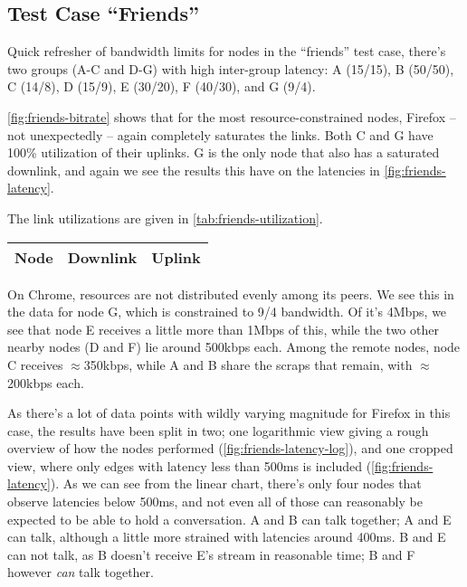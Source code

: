 \subsection{Test Case ``Friends''}

Quick refresher of bandwidth limits for nodes in the ``friends'' test case, there's two groups (A-C and D-G) with high inter-group latency: A (15/15), B (50/50), C (14/8), D (15/9), E (30/20), F (40/30), and G (9/4).

\autoref{fig:friends-bitrate} shows that for the most resource-constrained nodes, Firefox -- not unexpectedly -- again completely saturates the links. Both C and G have 100\% utilization of their uplinks. G is the only node that also has a saturated downlink, and again we see the results this have on the latencies in \autoref{fig:friends-latency}.

The link utilizations are given in \autoref{tab:friends-utilization}.

\begin{center}
    \begin{tabular}{| l | l | l |}
    \hline
    \textbf{Node} & \textbf{Downlink} & \textbf{Uplink} \\ \hline
    
    \hline
    \end{tabular}
\end{center}

On Chrome, resources are not distributed evenly among its peers. We see this in the data for node G, which is constrained to 9/4 bandwidth. Of it's 4Mbps, we see that node E receives a little more than 1Mbps of this, while the two other nearby nodes (D and F) lie around 500kbps each. Among the remote nodes, node C receives $\approx$350kbps, while A and B share the scraps that remain, with $\approx$200kbps each.

As there's a lot of data points with wildly varying magnitude for Firefox in this case, the results have been split in two; one logarithmic view giving a rough overview of how the nodes performed (\autoref{fig:friends-latency-log}), and one cropped view, where only edges with latency less than 500ms is included (\autoref{fig:friends-latency}). As we can see from the linear chart, there's only four nodes that observe latencies below 500ms, and not even all of those can reasonably be expected to be able to hold a conversation. A and B can talk together; A and E can talk, although a little more strained with latencies around 400ms. B and E can not talk, as B doesn't receive E's stream in reasonable time; B and F however \emph{can} talk together.

